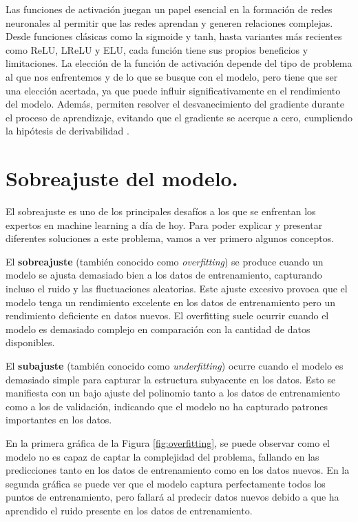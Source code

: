 Las funciones de activación juegan un papel esencial en la formación de redes neuronales al permitir que las redes aprendan y generen relaciones complejas. Desde funciones clásicas como la sigmoide y tanh, hasta variantes más recientes como ReLU, LReLU y ELU, cada función tiene sus propios beneficios y limitaciones. La elección de la función de activación depende del tipo de problema al que nos enfrentemos y de lo que se busque con el modelo, pero tiene que ser una elección acertada, ya que puede influir significativamente en el rendimiento del modelo. Además, permiten resolver el desvanecimiento del gradiente durante el proceso de aprendizaje, evitando que el gradiente se acerque a cero, cumpliendo la hipótesis de derivabilidad \citep{pajares2021aprendizaje}.












\section{Sobreajuste del modelo.}

El sobreajuste es uno de los principales desafíos a los que se enfrentan los expertos en machine learning a día de hoy. Para poder explicar y presentar diferentes soluciones a este problema, vamos a ver primero algunos conceptos.


El \textbf{sobreajuste} (también conocido como \textit{overfitting}) se produce cuando un modelo se ajusta demasiado bien a los datos de entrenamiento, capturando incluso el ruido y las fluctuaciones aleatorias. Este ajuste excesivo provoca que el modelo tenga un rendimiento excelente en los datos de entrenamiento pero un rendimiento deficiente en datos nuevos. El overfitting suele ocurrir cuando el modelo es demasiado complejo en comparación con la cantidad de datos disponibles.

El \textbf{subajuste} (también conocido como \textit{underfitting}) ocurre cuando el modelo es demasiado simple para capturar la estructura subyacente en los datos. Esto se manifiesta con un bajo ajuste del polinomio tanto a los datos de entrenamiento como a los de validación, indicando que el modelo no ha capturado patrones importantes en los datos.

En la primera gráfica de la Figura \ref{fig:overfitting}, se puede observar como el modelo no es capaz de captar la complejidad del problema, fallando en las predicciones tanto en los datos de entrenamiento como en los datos nuevos. En la segunda gráfica se puede ver que el modelo captura perfectamente todos los puntos de entrenamiento, pero fallará al predecir datos nuevos debido a que ha aprendido el ruido presente en los datos de entrenamiento.

